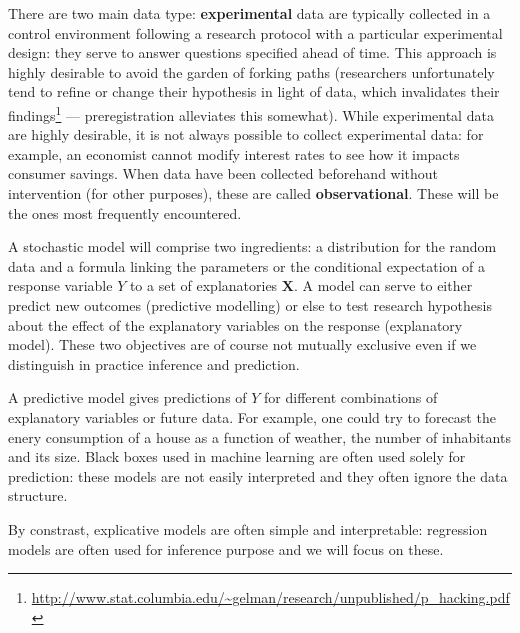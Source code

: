 \documentclass[
  11pt,
  letterpaper,
]{book}
\renewcommand{\href}[2]{#2\footnote{\url{#1}}}
\theoremstyle{definition}
\theoremstyle{definition}
\theoremstyle{definition}
\theoremstyle{definition}
\theoremstyle{remark}
\begin{document}
There are two main data type: \textbf{experimental} data are typically collected in a control environment following a research protocol with a particular experimental design: they serve to answer questions specified ahead of time. This approach is highly desirable to avoid the garden of forking paths \href{http://www.stat.columbia.edu/~gelman/research/unpublished/p_hacking.pdf}{(researchers unfortunately tend to refine or change their hypothesis in light of data, which invalidates their findings} --- preregistration alleviates this somewhat). While experimental data are highly desirable, it is not always possible to collect experimental data: for example, an economist cannot modify interest rates to see how it impacts consumer savings. When data have been collected beforehand without intervention (for other purposes), these are called \textbf{observational}. These will be the ones most frequently encountered.

A stochastic model will comprise two ingredients: a distribution for the random data and a formula linking the parameters or the conditional expectation of a response variable \(Y\) to a set of explanatories \(\mathbf{X}\). A model can serve to either predict new outcomes (predictive modelling) or else to test research hypothesis about the effect of the explanatory variables on the response (explanatory model). These two objectives are of course not mutually exclusive even if we distinguish in practice inference and prediction.

A predictive model gives predictions of \(Y\) for different combinations of explanatory variables or future data. For example, one could try to forecast the enery consumption of a house as a function of weather, the number of inhabitants and its size. Black boxes used in machine learning are often used solely for prediction: these models are not easily interpreted and they often ignore the data structure.

By constrast, explicative models are often simple and interpretable: regression models are often used for inference purpose and we will focus on these.
\end{document}
